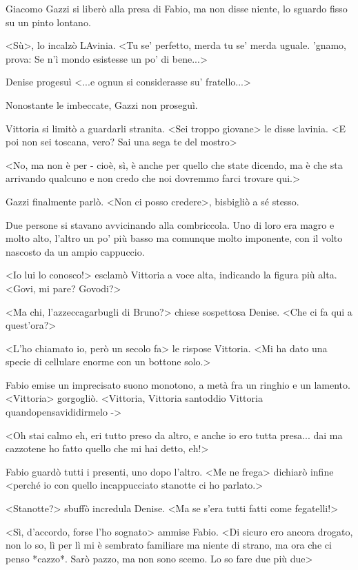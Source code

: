 Giacomo Gazzi si liberò alla presa di Fabio, ma non disse niente, lo sguardo fisso su un pinto lontano. 

<Sù>, lo incalzò LAvinia. <Tu se' perfetto, merda tu se' merda uguale. 'gnamo, prova: Se n'ì mondo esistesse un po' di bene...>

Denise progesuì <...e ognun si considerasse su' fratello...>

Nonostante le imbeccate, Gazzi non proseguì.

Vittoria si limitò a guardarli stranita. <Sei troppo giovane> le disse lavinia. <E poi non sei toscana, vero? Sai una sega te del mostro>

<No, ma non è per - cioè, sì, è anche per quello che state dicendo, ma è che sta arrivando qualcuno e non credo che noi dovremmo farci trovare qui.> 

Gazzi finalmente parlò. <Non ci posso credere>, bisbigliò a sé stesso.

Due persone si stavano avvicinando alla combriccola. Uno di loro era magro e molto alto, l'altro un po' più basso ma comunque molto imponente, con il volto nascosto da un ampio cappuccio.

<Io lui lo conosco!> esclamò Vittoria a voce alta, indicando la figura più alta. <Govi, mi pare? Govodi?>

<Ma chi, l'azzeccagarbugli di Bruno?> chiese sospettosa Denise. <Che ci fa qui a quest'ora?>

<L'ho chiamato io, però un secolo fa> le rispose Vittoria. <Mi ha dato una specie di cellulare enorme con un bottone solo.>

Fabio emise un imprecisato suono monotono, a metà fra un ringhio e un lamento.<Vittoria> gorgogliò. <Vittoria, Vittoria santoddio Vittoria quandopensavididirmelo ->

<Oh stai calmo eh, eri tutto preso da altro, e anche io ero tutta presa... dai ma cazzotene ho fatto quello che mi hai detto, eh!>

Fabio guardò tutti i presenti, uno dopo l'altro. <Me ne frega> dichiarò infine <perché io con quello incappucciato stanotte ci ho parlato.>

<Stanotte?> sbuffò incredula Denise. <Ma se s'era tutti fatti come fegatelli!>

<Sì, d'accordo, forse l'ho sognato> ammise Fabio. <Di sicuro ero ancora drogato, non lo so, lì per lì  mi è sembrato familiare ma niente di strano, ma ora che ci penso *cazzo*. Sarò pazzo, ma non sono scemo. Lo so fare due più due>

